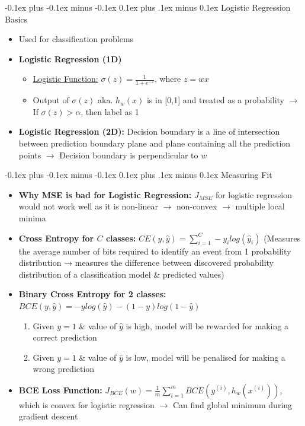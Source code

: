 \documentclass[landscape]{article}
\makeatletter
\renewcommand{\subsection}{\@startsection{subsection}{2}{0mm}%
  {-0.1ex plus -0.1ex minus -0.1ex}%
  {0.1ex plus .1ex minus 0.1ex}%
{\normalfont\scriptsize\bfseries}}
\makeatother
\begin{document}
\begin{multicols*}{5}
        \subsection{Logistic Regression Basics}
        \begin{itemize}
          \item Used for classification problems 
          \item \textbf{Logistic Regression (1D)}
          \begin{itemize}
            \item \underline{Logistic Function:} $\sigma(z) = \frac{1}{1 + e^{-z}}$, where $z = wx$
            \item Output of $\sigma(z)$ aka. $h_w(x)$ is in [0,1] and treated as a probability $\rightarrow$ If $\sigma(z)>\alpha$, then label as 1
          \end{itemize}
          \item \textbf{Logistic Regression (2D):} Decision boundary is a line of intersection between prediction boundary plane and plane containing all the prediction points $\rightarrow$ Decision boundary is perpendicular to $w$
        \end{itemize}

        \subsection{Measuring Fit}
        \begin{itemize}
          \item \textbf{Why MSE is bad for Logistic Regression:} $J_{MSE}$ for logistic regression would not work well as it is non-linear $\rightarrow$ non-convex $\rightarrow$ multiple local minima
          \item \textbf{Cross Entropy for $C$ classes:} $CE(y, \hat{y}) = \sum_{i=1}^C -y_ilog(\hat{y}_i)$ (Measures the average number of bits required to identify an event from 1 probability distribution → measures the difference between discovered probability distribution of a classification model \& predicted values)
          \item \textbf{Binary Cross Entropy for 2 classes:} $BCE(y, \hat{y}) = -ylog(\hat{y}) -(1-y)log(1-\hat{y})$
          \begin{enumerate}
            \item Given $y=1$ \& value of $\hat{y}$ is high, model will be rewarded for making a correct prediction
            \item Given $y=1$ \& value of $\hat{y}$ is low, model will be penalised for making a wrong prediction
          \end{enumerate}
          \item \textbf{BCE Loss Function:} $J_{BCE}(w) = \frac{1}{m}\sum^m_{i=1}BCE(y^{(i)}, h_w(x^{(i)}))$, which is convex for logistic regression $\rightarrow$ Can find global minimum during gradient descent
        \end{itemize}


\end{multicols*}
\end{document}
